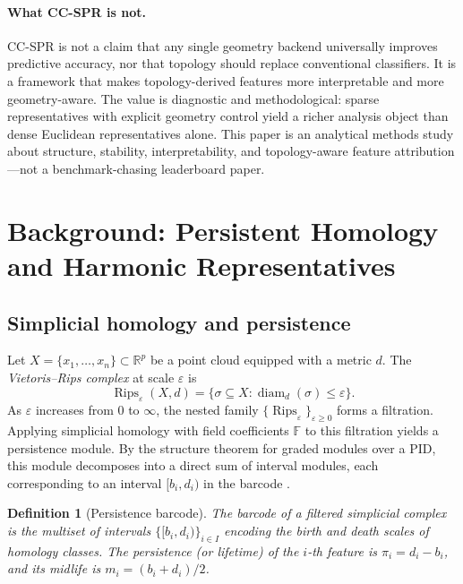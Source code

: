 \documentclass[11pt]{article}
\newtheorem{definition}[theorem]{Definition}
\DeclareMathOperator{\Rips}{Rips}
\DeclareMathOperator{\diam}{diam}
\begin{document}
\paragraph{What CC-SPR is not.}
CC-SPR is not a claim that any single geometry backend universally improves predictive accuracy, nor that topology should replace conventional classifiers.
It is a framework that makes topology-derived features more interpretable and more geometry-aware.
The value is diagnostic and methodological: sparse representatives with explicit geometry control yield a richer analysis object than dense Euclidean representatives alone.
This paper is an analytical methods study about structure, stability, interpretability, and topology-aware feature attribution---not a benchmark-chasing leaderboard paper.

\section{Background: Persistent Homology and Harmonic Representatives}
\label{sec:background}

\subsection{Simplicial homology and persistence}

Let $X = \{x_1, \ldots, x_n\} \subset \mathbb{R}^p$ be a point cloud equipped with a metric $d$.
The \emph{Vietoris--Rips complex} at scale $\varepsilon$ is
\[
\Rips_\varepsilon(X, d) = \bigl\{ \sigma \subseteq X : \diam_d(\sigma) \le \varepsilon \bigr\}.
\]
As $\varepsilon$ increases from $0$ to $\infty$, the nested family $\{\Rips_\varepsilon\}_{\varepsilon \ge 0}$ forms a filtration.
Applying simplicial homology with field coefficients $\mathbb{F}$ to this filtration yields a persistence module.
By the structure theorem for graded modules over a PID, this module decomposes into a direct sum of interval modules, each corresponding to an interval $[b_i, d_i)$ in the barcode \cite{zomorodian2005}.

\begin{definition}[Persistence barcode]\label{def:barcode}
The \emph{barcode} of a filtered simplicial complex is the multiset of intervals $\{[b_i, d_i)\}_{i \in I}$ encoding the birth and death scales of homology classes.
The \emph{persistence} (or \emph{lifetime}) of the $i$-th feature is $\pi_i = d_i - b_i$, and its \emph{midlife} is $m_i = (b_i + d_i)/2$.
\end{definition}
\end{document}
